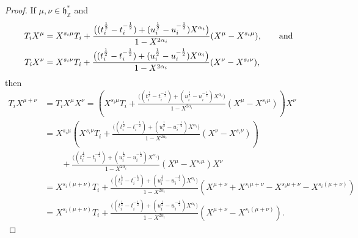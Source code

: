\documentclass[11pt]{article}
\theoremstyle{plain}
\theoremstyle{definition}
\theoremstyle{remark}
\numberwithin{equation}{section}
\def\ZZ{\mathbb{Z}}
\def\fh{\mathfrak{h}}
\newcounter{r}
\newcounter{s}
\begin{document}
\begin{proof}
If $\mu, \nu\in \fh_\ZZ^*$ and 
\begin{align*}
T_iX^\mu 
&= X^{s_i\mu}T_i + 
\frac{\big((t_i^{\frac12}-t_i^{-\frac12})+(u_i^{\frac12}-u_i^{-\frac12})X^{\alpha_i} \big)
}{1-X^{2\alpha_i} }(X^{\mu}-X^{s_i\mu}), \qquad\hbox{and} \\
T_iX^\nu 
&= X^{s_i\nu}T_i + 
\frac{\big((t_i^{\frac12}-t_i^{-\frac12})+(u_i^{\frac12}-u_i^{-\frac12})X^{\alpha_i} \big)
}{1-X^{2\alpha_i} }(X^{\nu}-X^{s_i\nu}),
\end{align*}
then
\begin{align}
T_iX^{\mu+\nu}
&= T_iX^\mu X^\nu
= \left(X^{s_i\mu}T_i + 
\frac{\big((t_i^{\frac12}-t_i^{-\frac12})+(u_i^{\frac12}-u_i^{-\frac12})X^{\alpha_i} \big)
}{1-X^{2\alpha_i} }(X^{\mu}-X^{s_i\mu}) \right) X^{\nu} \nonumber \\
&= X^{s_i\mu}
\left(
X^{s_i\nu}T_i + 
\frac{\big((t_i^{\frac12}-t_i^{-\frac12})+(u_i^{\frac12}-u_i^{-\frac12})X^{\alpha_i} \big)
}{1-X^{2\alpha_i} }(X^{\nu}-X^{s_i\nu}) \right)  \nonumber \\
&\qquad
+\frac{\big((t_i^{\frac12}-t_i^{-\frac12})+(u_i^{\frac12}-u_i^{-\frac12})X^{\alpha_i} \big)
}{1-X^{2\alpha_i} }(X^{\mu}-X^{s_i\mu}) X^{\nu}  \nonumber \\
&= X^{s_i(\mu+\nu)}T_i
+\frac{\big((t_i^{\frac12}-t_i^{-\frac12})+(u_i^{\frac12}-u_i^{-\frac12})X^{\alpha_i} \big)
}{1-X^{2\alpha_i} }(X^{\mu+\nu} +X^{s_i\mu+\nu}-X^{s_i\mu+\nu}-X^{s_i(\mu+\nu)})
\nonumber \\
&= X^{s_i(\mu+\nu)}T_i
+\frac{\big((t_i^{\frac12}-t_i^{-\frac12})+(u_i^{\frac12}-u_i^{-\frac12})X^{\alpha_i} \big)
}{1-X^{2\alpha_i} }(X^{\mu+\nu} - X^{s_i(\mu+\nu)}).
\label{*}
\end{align}


\end{proof}
\end{document}
